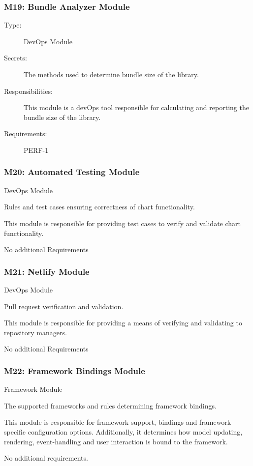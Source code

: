 \documentclass[12pt, titlepage]{article}
\begin{document}
\subsubsection{M19: Bundle Analyzer Module}
\begin{description}
\item[Type:] DevOps Module
\item[Secrets:] The methods used to determine bundle size of the library.  
\item[Responsibilities:]  This module is a devOps tool responsible for calculating and reporting the bundle size of the library. 
\item[Requirements:] PERF-1
\end{description}


\subsubsection{M20: Automated Testing Module}
\begin{description}[style=nextline]
\item[Type:]  DevOps Module
\item[Secrets:] Rules and test cases ensuring correctness of chart functionality.
\item[Responsibilities:]  This module is responsible for providing test cases to verify and validate chart functionality. 
\item[Requirements:] No additional Requirements
\end{description}

\subsubsection{M21: Netlify Module}
\begin{description}[style=nextline]
\item[Type:]  DevOps Module
\item[Secrets:] Pull request verification and validation.  
\item[Responsibilities:]  This module is responsible for providing a means of verifying and validating to repository managers. 
\item[Requirements:] No additional Requirements
\end{description}

\subsubsection{M22: Framework Bindings Module}
\begin{description} [style=nextline]
\item[Type:] Framework Module
\item[Secrets:] The supported frameworks and rules determining framework bindings. 
\item[Responsibilities:]  This module is responsible for framework support, bindings and framework specific configuration options. Additionally, it determines how model updating, rendering, event-handling and user interaction is bound to the framework.
\item[Requirements:] No additional requirements. 
\end{description}
\end{document}
